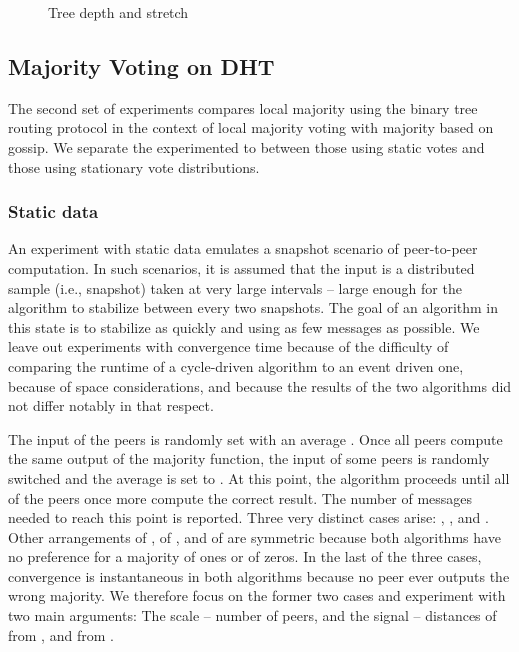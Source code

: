 \documentclass[12pt,english,journal]{elsarticle}
\numberwithin{equation}{section}
\numberwithin{figure}{section}
\theoremstyle{plain}
\theoremstyle{plain}
\begin{document}
\begin{figure*}[p]
\caption{Tree depth and stretch}


\begin{minipage}[t]{0.5\textwidth}\end{minipage}\begin{minipage}[t]{0.5\textwidth}\end{minipage}

\end{figure*}



\subsection{Majority Voting on DHT}

The second set of experiments compares local majority using the binary
tree routing protocol in the context of local majority voting with
majority based on gossip. We separate the experimented to between
those using static votes and those using stationary vote distributions. 


\subsubsection{Static data}

An experiment with static data emulates a snapshot scenario of peer-to-peer
computation. In such scenarios, it is assumed that the input is a
distributed sample (i.e., snapshot) taken at very large intervals
-- large enough for the algorithm to stabilize between every two snapshots.
The goal of an algorithm in this state is to stabilize as quickly
and using as few messages as possible. We leave out experiments with
convergence time because of the difficulty of comparing the runtime
of a cycle-driven algorithm to an event driven one, because of space
considerations, and because the results of the two algorithms did
not differ notably in that respect.

The input of the peers is randomly set with an average .
Once all peers compute the same output of the majority function, the
input of some peers is randomly switched and the average is set to
. At this point, the algorithm proceeds until all of
the peers once more compute the correct result. The number of messages
needed to reach this point is reported. Three very distinct cases
arise: , ,
and . Other arrangements of ,
of , and of  are symmetric because both
algorithms have no preference for a majority of ones or of zeros.
In the last of the three cases, convergence is instantaneous in both
algorithms because no peer ever outputs the wrong majority. We therefore
focus on the former two cases and experiment with two main arguments:
The scale -- number of peers, and the signal -- distances of 
from , and from .
\end{document}
